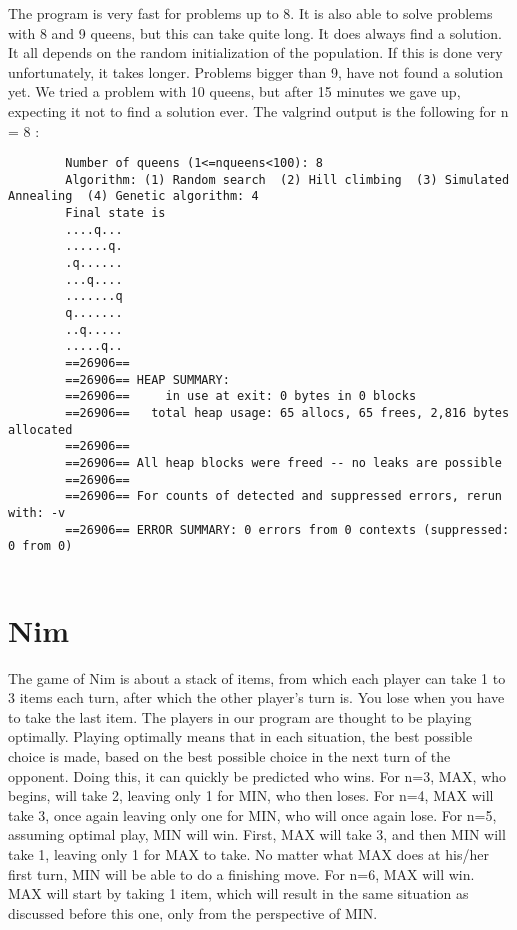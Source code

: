 \documentclass{article}
\begin{document}
	The program is very fast for problems up to 8. It is also able to solve problems with 8 and 9 queens, but this can take quite long. It does always find a solution. It all depends on the random initialization of the population. If this is done very unfortunately, it takes longer. Problems bigger than 9, have not found a solution yet. We tried a problem with 10 queens, but after 15 minutes we gave up, expecting it not to find a solution ever. The valgrind output is the following for n = 8 :
		\begin{lstlisting}
		Number of queens (1<=nqueens<100): 8
		Algorithm: (1) Random search  (2) Hill climbing  (3) Simulated Annealing  (4) Genetic algorithm: 4
		Final state is
		....q...
		......q.
		.q......
		...q....
		.......q
		q.......
		..q.....
		.....q..
		==26906== 
		==26906== HEAP SUMMARY:
		==26906==     in use at exit: 0 bytes in 0 blocks
		==26906==   total heap usage: 65 allocs, 65 frees, 2,816 bytes allocated
		==26906== 
		==26906== All heap blocks were freed -- no leaks are possible
		==26906== 
		==26906== For counts of detected and suppressed errors, rerun with: -v
		==26906== ERROR SUMMARY: 0 errors from 0 contexts (suppressed: 0 from 0)
		
		\end{lstlisting}
		
	
	\section*{Nim}
	
	The game of Nim is about a stack of items, from which each player can take 1 to 3 items each turn, after which the other player's turn is. You lose when you have to take the last item. The players in our program are thought to be playing optimally. Playing optimally means that in each situation, the best possible choice is made, based on the best possible choice in the next turn of the opponent. Doing this, it can quickly be predicted who wins. For n=3, MAX, who begins, will take 2, leaving only 1 for MIN, who then loses. For n=4, MAX will take 3, once again leaving only one for MIN, who will once again lose. For n=5, assuming optimal play, MIN will win. First, MAX will take 3, and then MIN will take 1, leaving only 1 for MAX to take. No matter what MAX does at his/her first turn, MIN will be able to do a finishing move. For n=6, MAX will win. MAX will start by taking 1 item, which will result in the same situation as discussed before this one, only from the perspective of MIN.
	
\end{document}
